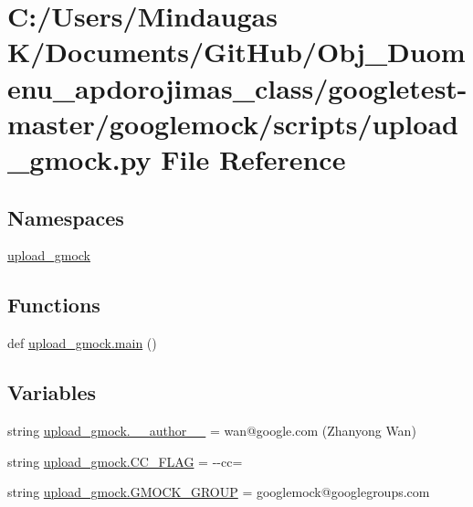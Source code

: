 \hypertarget{googletest-master_2googlemock_2scripts_2upload__gmock_8py}{}\section{C\+:/\+Users/\+Mindaugas K/\+Documents/\+Git\+Hub/\+Obj\+\_\+\+Duomenu\+\_\+apdorojimas\+\_\+class/googletest-\/master/googlemock/scripts/upload\+\_\+gmock.py File Reference}
\label{googletest-master_2googlemock_2scripts_2upload__gmock_8py}
\subsection*{Namespaces}
\begin{DoxyCompactItemize}
\item 
 \mbox{\hyperlink{namespaceupload__gmock}{upload\+\_\+gmock}}
\end{DoxyCompactItemize}
\subsection*{Functions}
\begin{DoxyCompactItemize}
\item 
def \mbox{\hyperlink{namespaceupload__gmock_aea9cb062f9294622c32e54eb937f588e}{upload\+\_\+gmock.\+main}} ()
\end{DoxyCompactItemize}
\subsection*{Variables}
\begin{DoxyCompactItemize}
\item 
string \mbox{\hyperlink{namespaceupload__gmock_a56f523bfe887b27722a3ea662b4d88d7}{upload\+\_\+gmock.\+\_\+\+\_\+author\+\_\+\+\_\+}} = \textquotesingle{}wan@google.\+com (Zhanyong Wan)\textquotesingle{}
\item 
string \mbox{\hyperlink{namespaceupload__gmock_a463de67b37725c16ba31c5d4702e15b8}{upload\+\_\+gmock.\+C\+C\+\_\+\+F\+L\+AG}} = \textquotesingle{}-\/-\/cc=\textquotesingle{}
\item 
string \mbox{\hyperlink{namespaceupload__gmock_acf8fe60647d8c3748b0e22dcf669efee}{upload\+\_\+gmock.\+G\+M\+O\+C\+K\+\_\+\+G\+R\+O\+UP}} = \textquotesingle{}googlemock@googlegroups.\+com\textquotesingle{}
\end{DoxyCompactItemize}
